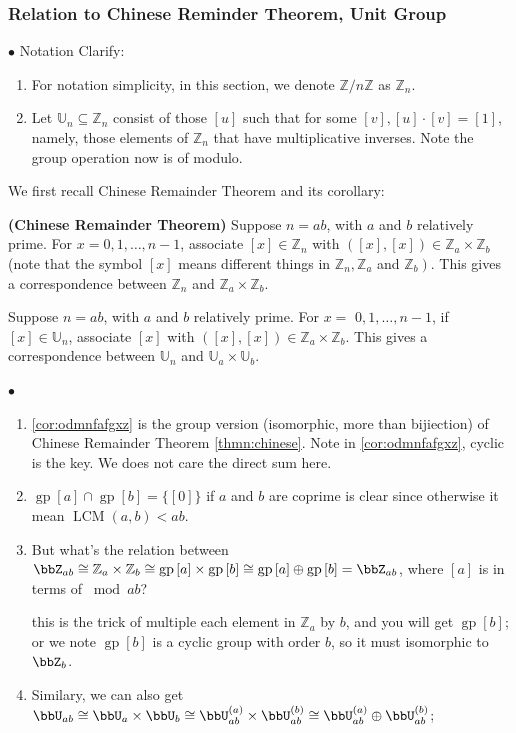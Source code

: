 \documentclass{article}
\newcommand{\bfs}[1]{\textbf{({#1}) }}
\newcommand{\gp}{\operatorname{gp}}
\newcommand{\LCM}{\operatorname{LCM}}
\begin{document}
\subsubsection{Relation to Chinese Reminder Theorem, Unit Group}
$\bullet$ Notation Clarify:
\begin{enumerate}
    \item For notation simplicity, in this section, we denote $\mathbb{Z}/ {n}\mathbb{Z}$ as $\mathbb{Z}_{n}$.  
    \item Let  $\mathbb{U}_{n} \subseteq \mathbb{Z}_{n}$ consist of those $[u]$ such that for some $[v],[u] \cdot[v]=[1]$, namely, those elements of $\mathbb{Z}_{n}$ that have multiplicative inverses. Note the group operation now is  of modulo.
\end{enumerate}
We first recall Chinese Remainder Theorem and its corollary:
\begin{thma}\bfs{Chinese Remainder Theorem}\label{thmn:chinese}
Suppose $n=a b$, with $a$ and $b$ relatively prime. For $x=0,1, \ldots, n-1$, associate $[x] \in \mathbb{Z}_{n}$ with $([x],[x]) \in \mathbb{Z}_{a} \times \mathbb{Z}_{b}$ (note that the symbol $[x]$ means different things in $\mathbb{Z}_{n}, \mathbb{Z}_{a}$ and $\left.\mathbb{Z}_{b}\right)$. This gives a  correspondence between $\mathbb{Z}_{n}$ and $\mathbb{Z}_{a} \times \mathbb{Z}_{b}$.
\end{thma} 
\begin{cora}\label{cor:onkenq}
Suppose $n=a b$, with $a$ and $b$ relatively prime. For $x=$ $0,1, \ldots, n-1$, if $[x] \in \mathbb{U}_{n}$, associate $[x]$ with $([x],[x]) \in \mathbb{Z}_{a} \times \mathbb{Z}_{b}$. This gives a  correspondence between $\mathbb{U}_{n}$ and $\mathbb{U}_{a} \times \mathbb{U}_{b}$.
\end{cora}


$\bullet$ 
\begin{enumerate}
    \item \cref{cor:odmnfafgxz} is the group version (isomorphic, more than bijiection) of Chinese Remainder Theorem \cref{thmn:chinese}. Note in \cref{cor:odmnfafgxz}, cyclic is the key. We does not care the direct sum here.
        \item $\gp{[a]}\cap \gp{[b]}=\{[0]\}$  if $a$ and $b$ are coprime is clear since otherwise it mean $\LCM(a,b)<ab$. 
    \item But what's the relation between $\bbZ_{ab}\cong\mathbb{Z}_{a} \times \mathbb{Z}_{b}\cong \gp{[a]}\times \gp{[b]} \cong \gp{[a]}\oplus \gp{[b]}=\bbZ_{ab}$, where ${[a]}$ is in terms of $\bmod ab$?
    
     this is the trick of multiple each element in $\mathbb{Z}_{a}$ by $b$, and you will get $\gp{[b]}$; or we note $\gp{[b]}$ is a cyclic group with order $b$, so it must isomorphic to $\bbZ_b$.
    \item Similary, we can also get $\bbU_{ab} \cong \bbU_a \times \bbU_b \cong \bbU_{ab}^{(a)} \times \bbU_{ab}^{(b)} \cong \bbU_{ab}^{(a)} \oplus \bbU_{ab}^{(b)}$;

\end{enumerate}
\end{document}
